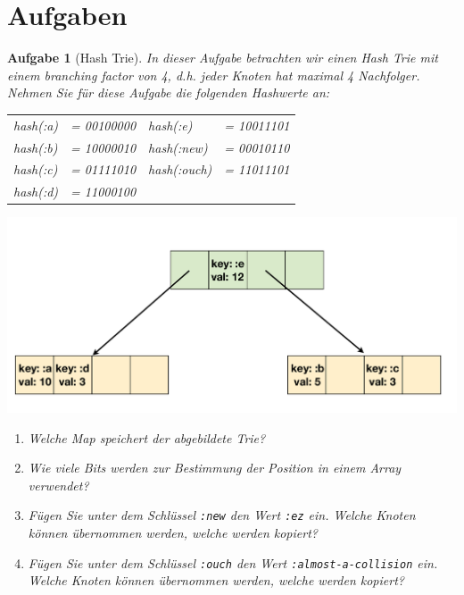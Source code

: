 \documentclass[11pt,a4paper]{article}
\newcounter{numb}
\theoremstyle{break}
\newtheorem{aufgabe}{Aufgabe}[numb]
\begin{document}
\section{Aufgaben}
\begin{aufgabe}[Hash Trie]

    In dieser Aufgabe betrachten wir einen Hash Trie mit einem branching factor von 4,
    d.h. jeder Knoten hat maximal 4 Nachfolger.
    Nehmen Sie f\"ur diese Aufgabe die folgenden Hashwerte an:

    \begin{center}
    \begin{tabular}{l@{}ll@{}l}
        hash(:a)    &= \colorbox{red!15}{00}\colorbox{blue!15}{10}\colorbox{orange!15}{00}\colorbox{green!15}{00} &hash(:e)    &= \colorbox{red!15}{10}\colorbox{blue!15}{01}\colorbox{orange!15}{11}\colorbox{green!15}{01}\\
        hash(:b)    &= \colorbox{red!15}{10}\colorbox{blue!15}{00}\colorbox{orange!15}{00}\colorbox{green!15}{10} &hash(:new)  &= \colorbox{red!15}{00}\colorbox{blue!15}{01}\colorbox{orange!15}{01}\colorbox{green!15}{10}\\
        hash(:c)    &= \colorbox{red!15}{01}\colorbox{blue!15}{11}\colorbox{orange!15}{10}\colorbox{green!15}{10} &hash(:ouch) &= \colorbox{red!15}{11}\colorbox{blue!15}{01}\colorbox{orange!15}{11}\colorbox{green!15}{01}\\
        hash(:d)    &= \colorbox{red!15}{11}\colorbox{blue!15}{00}\colorbox{orange!15}{01}\colorbox{green!15}{00} &\\
    \end{tabular}
    \end{center}

\begin{center}
    \includegraphics[scale=0.4]{hashtrie.pdf}
\end{center}

\begin{enumerate}[label=\alph*)]
\item
    Welche Map speichert der abgebildete Trie?
\item
    Wie viele Bits werden zur Bestimmung der Position in einem Array verwendet?
\item
    F\"ugen Sie unter dem Schl\"ussel \texttt{:new} den Wert \texttt{:ez} ein.
    Welche Knoten k\"onnen \"ubernommen werden, welche werden kopiert?
\item
    F\"ugen Sie unter dem Schl\"ussel \texttt{:ouch} den Wert \texttt{:almost-a-collision} ein.
    Welche Knoten k\"onnen \"ubernommen werden, welche werden kopiert?
\end{enumerate}
\end{aufgabe}
\end{document}
